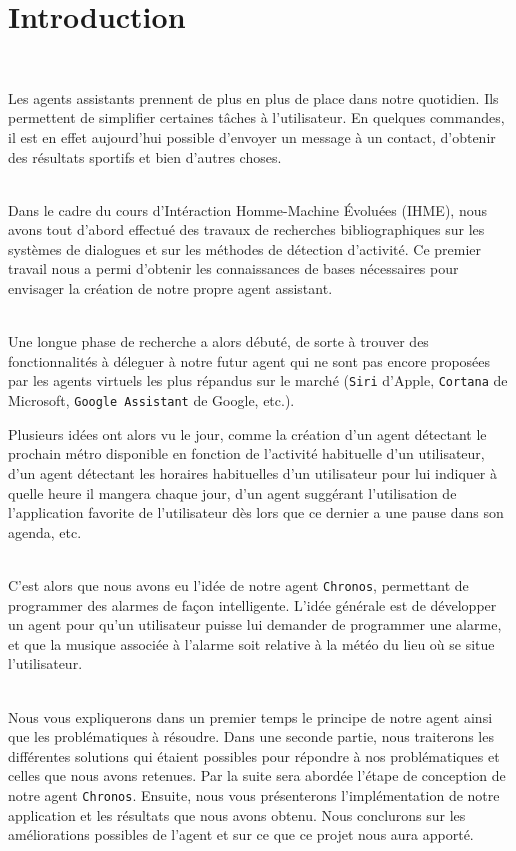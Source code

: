 \chapter*{Introduction}
\thispagestyle{plain}
~\\[1cm]
{ \large

Les agents assistants prennent de plus en plus de place dans notre quotidien.  Ils permettent de simplifier certaines tâches à l'utilisateur. En quelques  commandes, il est en effet aujourd'hui possible d'envoyer un message à un contact, d'obtenir des résultats sportifs et bien d'autres choses.

~\\\indent
Dans le cadre du cours d'\textsf{Intéraction Homme-Machine \'Evoluées} (\textsf{IHME}), nous avons tout d'abord effectué des travaux de recherches bibliographiques sur les systèmes de dialogues et sur les méthodes de détection d'activité. Ce premier  travail nous a permi d'obtenir les connaissances de bases nécessaires pour envisager la création de notre propre agent assistant.

~\\\indent
Une longue phase de recherche a alors débuté, de sorte à trouver des fonctionnalités à déleguer à notre futur agent qui ne sont pas encore proposées par les agents virtuels les plus répandus sur le marché (\og \texttt{Siri} \fg{} d'Apple, \og \texttt{Cortana} \fg{} de Microsoft, \og \texttt{Google Assistant} \fg{} de Google, etc.).

Plusieurs idées ont alors vu le jour, comme la création d'un agent détectant le prochain métro disponible en fonction de l'activité habituelle d'un utilisateur, d'un agent détectant les horaires habituelles d'un utilisateur pour lui indiquer à quelle heure il mangera chaque jour, d'un agent suggérant l'utilisation de l'application favorite de l'utilisateur dès lors que ce dernier a une pause dans son agenda, etc.

~\\\indent
C'est alors que nous avons eu l'idée de notre agent \texttt{Chronos}, permettant de programmer des alarmes de façon intelligente. L'idée générale est de développer un agent pour qu'un utilisateur puisse lui demander de programmer une alarme, et que la musique associée à l'alarme soit relative à la météo du lieu où se situe l'utilisateur.

~\\\indent
Nous vous expliquerons dans un premier temps le principe de notre agent ainsi que les problématiques à résoudre. Dans une seconde partie, nous traiterons les différentes solutions qui étaient possibles pour répondre à nos problématiques et celles que nous avons retenues. Par la suite sera abordée l'étape de conception de notre agent \texttt{Chronos}. Ensuite, nous vous présenterons l'implémentation de notre application et les résultats que nous avons obtenu. Nous conclurons sur les améliorations possibles de l'agent et sur ce que ce projet nous aura apporté.


}
